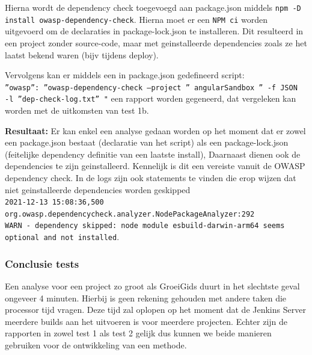 \begin{itemize}
    Hierna wordt de dependency check toegevoegd aan package.json middels \texttt{npm -D install owasp-dependency-check}. Hierna moet er een \texttt{NPM ci} worden uitgevoerd om de declaraties in package-lock.json te installeren. Dit resulteerd in een project zonder source-code, maar met geinstalleerde dependencies zoals ze het laatst bekend waren (bijv tijdens deploy).

    Vervolgens kan er middels een in package.json gedefineerd script:\\ \texttt{''owasp'': ''owasp-dependency-check --project '' angularSandbox '' -f JSON \\-l ''dep-check-log.txt'' "}%
    een rapport worden gegeneerd, dat vergeleken kan worden met de uitkomsten van test 1b.

    \textbf{Resultaat:}
    Er kan enkel een analyse gedaan worden op het moment dat er zowel een package.json bestaat (declaratie van het script) als een package-lock.json (feitelijke dependency definitie van een laatste install), Daarnaast dienen ook de dependencies te zijn geinstalleerd. Kennelijk is dit een vereiste vanuit de OWASP dependency check. In de logs zijn ook statements te vinden die erop wijzen dat niet geinstalleerde dependencies worden geskipped\\
    \texttt{2021-12-13 15:08:36,500\\
    org.owasp.dependencycheck.analyzer.NodePackageAnalyzer:292\\
    WARN  - dependency skipped: node module esbuild-darwin-arm64 seems optional and not installed}.\\


    \subsubsection{Conclusie tests}
    Een analyse voor een project zo groot als GroeiGids duurt in het slechtste geval ongeveer 4 minuten. Hierbij is geen rekening gehouden met andere taken die processor tijd vragen. Deze tijd zal oplopen op het moment dat de Jenkins Server meerdere builds aan het uitvoeren is voor meerdere projecten. Echter zijn de rapporten in zowel test 1 als test 2 gelijk dus kunnen we beide manieren gebruiken voor de ontwikkeling van een methode.



\end{itemize}
